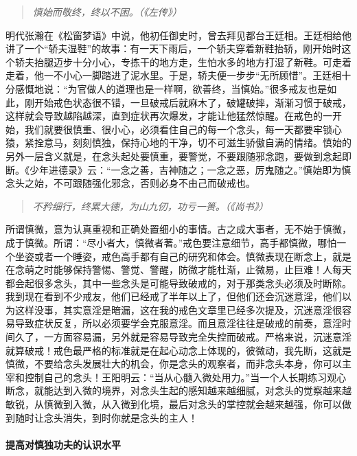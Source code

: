 \begin{quote}\it
    慎始而敬终，终以不困。（《左传》）
\end{quote}

明代张瀚在《松窗梦语》中说，他初任御史时，曾去拜见都台王廷相。王廷相给他讲了一个“轿夫湿鞋”的故事：有一天下雨后，一个轿夫穿着新鞋抬轿，刚开始时这个轿夫抬腿迈步十分小心，专拣干的地方走，生怕水多的地方打湿了新鞋。可走着走着，他一不小心一脚踏进了泥水里。于是，轿夫便一步步“无所顾惜”。王廷相十分感慨地说：“为官做人的道理也是一样啊，欲善终，当慎始。”很多戒友也是如此，刚开始戒色状态很不错，一旦破戒后就麻木了，破罐破摔，渐渐习惯于破戒，这样就会导致越陷越深，直到症状再次爆发，才能让他猛然惊醒。在戒色的一开始，我们就要很慎重、很小心，必须看住自己的每一个念头，每一天都要牢锁心猿，紧拴意马，刻刻慎独，保持心地的干净，切不可滋生骄傲自满的情绪。慎始的另外一层含义就是，在念头起处要慎重，要警觉，不要跟随邪念跑，要做到念起即断。《少年进德录》云：“一念之善，吉神随之；一念之恶，厉鬼随之。”慎始即为慎念头之始，不可跟随强化邪念，否则必身不由己而破戒也。

\begin{quote}\it
    不矜细行，终累大德，为山九仞，功亏一篑。（《尚书》）
\end{quote}

所谓慎微，意为认真重视和正确处置细小的事情。古之成大事者，无不始于慎微，成于慎微。所谓：“尽小者大，慎微者著。”戒色要注意细节，高手都慎微，哪怕一个坐姿或者一个睡姿，戒色高手都有自己的研究和体会。慎微表现在断念上，就是在念萌之时能够保持警惕、警觉、警醒，防微才能杜渐，止微易，止巨难！人每天都会起很多念头，其中一些念头是可能导致破戒的，对于那类念头必须及时断除。我到现在看到不少戒友，他们已经戒了半年以上了，但他们还会沉迷意淫，他们以为这样没事，其实意淫是暗漏，这在我的戒色文章里已经多次提及，沉迷意淫很容易导致症状反复，所以必须要学会克服意淫。而且意淫往往是破戒的前奏，意淫时间久了，一方面容易漏，另外就是容易导致完全失控而破戒。严格来说，沉迷意淫就算破戒！戒色最严格的标准就是在起心动念上体现的，彼微动，我先断，这就是慎微，不要给念头发展壮大的机会，你是念头的观察者，而非念头本身，你可以主宰和控制自己的念头！王阳明云：“当从心髓入微处用力。”当一个人长期练习观心断念，就能达到入微的境界，对念头生起的感知越来越细腻，对念头的觉察越来越敏锐，从慎微到入微，从入微到化境，最后对念头的掌控就会越来越强，你可以做到随时让念头消失，到时你就是念头的主人！

\paragraph{提高对慎独功夫的认识水平}

